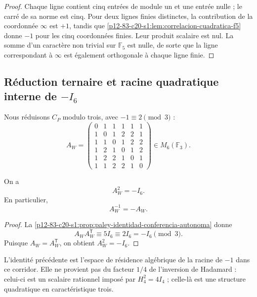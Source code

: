 \begin{proof}
Chaque ligne contient cinq entrées de module un et une entrée nulle ; le carré de sa
norme est cinq. Pour deux lignes finies distinctes, la contribution
de la coordonnée \(\infty\) est \(+1\), tandis que
\cref{p12-83-c20-s1:lem:correlacion-cuadratica-f5} donne \(-1\) pour les cinq coordonnées
finies. Leur produit scalaire est nul. La somme d'un caractère non trivial
sur \(\mathbb F_5\) est nulle, de sorte que la ligne correspondant à
\(\infty\) est également orthogonale à chaque ligne finie.
\end{proof}

\subsection{Réduction ternaire et racine quadratique interne de \texorpdfstring{\(-I_6\)}{-I₆}}

Nous réduisons \(C_P\) modulo trois, avec \(-1\equiv2\pmod3\) :
\begin{equation}
 A_W=
 \begin{pmatrix}
 0&1&1&1&1&1\\
 1&0&1&2&2&1\\
 1&1&0&1&2&2\\
 1&2&1&0&1&2\\
 1&2&2&1&0&1\\
 1&1&2&2&1&0
 \end{pmatrix}
 \in M_6(\mathbb F_3).
 \label{p12-83-c20-s1:eq:matriz-paley-witt-ternaria}
\end{equation}

\begin{theorem}
\label{p12-83-c20-s1:thm:aw-cuadrado-menos-identidad-autonomo}
On a
\begin{equation}
 \boxed{A_W^2=-I_6.}
 \label{p12-83-c20-s1:eq:aw-cuadrado-menos-identidad-autonomo}
\end{equation}
En particulier,
\[
 A_W^{-1}=-A_W.
\]
\end{theorem}

\begin{proof}
La \cref{p12-83-c20-s1:prop:paley-identidad-conferencia-autonoma} donne
\[
 A_WA_W^{\mathsf T}
 \equiv5I_6
 \equiv2I_6
 =-I_6
 \pmod3.
\]
Puisque \(A_W=A_W^{\mathsf T}\), on obtient \(A_W^2=-I_6\).
\end{proof}

L'identité précédente est l'espace de résidence algébrique de la racine de \(-1\)
dans ce corridor. Elle ne provient pas du facteur \(1/4\) de l'inversion de Hadamard :
celui-ci est un scalaire rationnel imposé par \(H_4^2=4I_4\) ; celle-là est une
structure quadratique en caractéristique trois.

